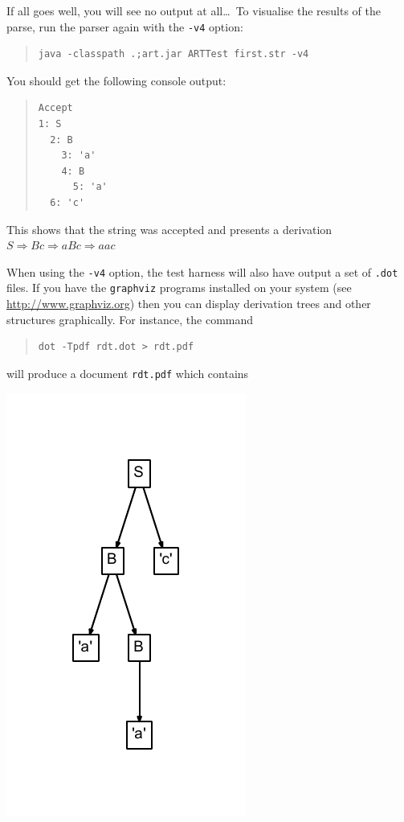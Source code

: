 If all goes well, you will see no output at all\ldots\  To visualise the results of the parse, run the parser again with the {\tt -v4} option:
\begin{quote}
\begin{verbatim}
java -classpath .;art.jar ARTTest first.str -v4
\end{verbatim}
\end{quote}
You should get the following console output:
\begin{quote}
\begin{verbatim}
Accept
1: S
  2: B
    3: 'a'
    4: B
      5: 'a'
  6: 'c'
\end{verbatim}
\end{quote}
This shows that the string was accepted and presents a derivation $S\Rightarrow B c\Rightarrow a B c\Rightarrow a a c$ 

When using the {\tt -v4} option, the test harness will also have output a set of {\tt .dot} files. If you have the {\tt graphviz} programs installed on your system (see \url{http://www.graphviz.org}) then you can display derivation trees and other structures graphically. For instance, the command

\begin{quote}
\begin{verbatim}
dot -Tpdf rdt.dot > rdt.pdf
\end{verbatim}
\end{quote}

will produce a document {\tt rdt.pdf} which contains

\includegraphics{firsta.pdf}


